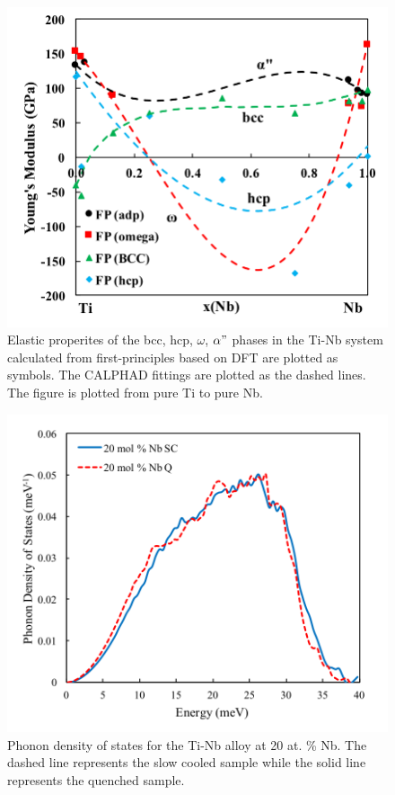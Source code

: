 \pagebreak
\begin{figure}[H]
	\centering
	\includegraphics[width=\textwidth]{Chapter-7/Figures/tinbelastic.png}
	\caption{Elastic properites of the bcc, hcp, $\omega$, $\alpha"$ phases in the Ti-Nb system calculated from first-principles based on DFT are plotted as symbols. The CALPHAD fittings are plotted as the dashed lines. The figure is plotted from pure Ti to pure Nb.}
	\label{Ch7-figure:tinbelastic}
\end{figure}

\pagebreak
\begin{figure}[H]
	\centering
	\includegraphics[width=\textwidth]{Chapter-7/Figures/50dos20.png}
	\caption{Phonon density of states for the Ti-Nb alloy at 20 at. \% Nb. The dashed line represents the slow cooled sample while the solid line represents the quenched sample.}
	\label{Ch7-figure:50dos20}
\end{figure}

